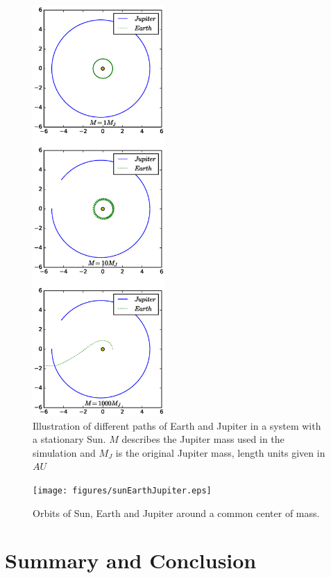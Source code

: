 \documentclass[twoside,twocolumn]{article}
\begin{document}
\begin{figure}[p]
\centering
\includegraphics[trim={0 2.5cm 0 2.5cm},width=0.45\textwidth, clip]{figures/earthJup.eps} 
\caption{Illustration of different paths of Earth and Jupiter in a system with a stationary Sun. $M$ describes the Jupiter mass used in the simulation and $M_J$ is the original Jupiter mass, length units given in $AU$}\label{fig:jupiter_mass}
\end{figure}
\begin{figure}[p]
\texttt{[image: figures/sunEarthJupiter.eps]} 
		\caption{Orbits of Sun, Earth and Jupiter around a common center of mass.}\label{fig:total_momentum}
\end{figure}
\section{Summary and Conclusion}
\label{sec:conclusion}
	
	
	
\end{document}
